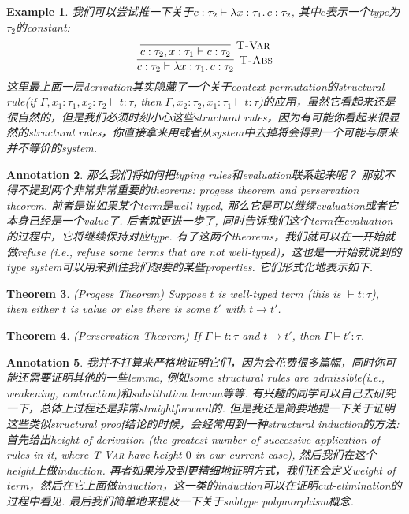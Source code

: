 \documentclass{article}
\newtheorem{theorem}{Theorem}[section]
\newtheorem{example}[theorem]{Example}
\newtheorem{annotation}[theorem]{Annotation}
\newcommand{\lam}[2]{\ensuremath{\lambda #1\ldotp #2}} %
\newcommand{\termtype}[2]{\ensuremath{#1:#2}}
\begin{document}
\begin{example}
\rm 我们可以尝试推一下关于$\termtype{c}{\tau_2}\vdash \termtype{\lam{\termtype{x}{\tau_1}}{c}}{\tau_2}$, 其中$c$表示一个type为$\tau_2$的constant:
\[
	\infer[\textsc{T-Abs}]{\termtype{c}{\tau_2}\vdash \termtype{\lam{\termtype{x}{\tau_1}}{c}}{\tau_2}}{\infer[\textsc{T-Var}]{\termtype{c}{\tau_2},\termtype{x}{\tau_1} \vdash \termtype{c}{\tau_2}}{}}
\]
这里最上面一层derivation其实隐藏了一个关于context permutation的structural rule(if $\Gamma,\termtype{x_1}{\tau_1},\termtype{x_2}{\tau_2} \vdash \termtype{t}{\tau}$, then $\Gamma,\termtype{x_2}{\tau_2},\termtype{x_1}{\tau_1} \vdash  \termtype{t}{\tau}$)的应用，虽然它看起来还是很自然的，但是我们必须时刻小心这些structural rules，因为有可能你看起来很显然的structural rules，你直接拿来用或者从system中去掉将会得到一个可能与原来并不等价的system.  
\end{example}

\begin{annotation}
\rm 那么我们将如何把typing rules和evaluation联系起来呢？ 那就不得不提到两个非常非常重要的theorems: \emph{progess theorem} and \emph{perservation theorem}. 前者是说如果某个term是well-typed, 那么它是可以继续evaluation或者它本身已经是一个value了. 后者就更进一步了, 同时告诉我们这个term在evaluation的过程中，它将继续保持对应type. 有了这两个theorems，我们就可以在一开始就做refuse (i.e., refuse some terms that are not well-typed)，这也是一开始就说到的type system可以用来抓住我们想要的某些properties. 它们形式化地表示如下.
\end{annotation}

\begin{theorem}
\rm (Progess Theorem) Suppose $t$ is well-typed term (this is $\vdash \termtype{t}{\tau}$), then either $t$ is value or else there is some $t'$ with $t \to t'$. 
\end{theorem}

\begin{theorem}
\rm (Perservation Theorem) If $\Gamma \vdash \termtype{t}{\tau}$ and $t \to t'$, then $\Gamma \vdash \termtype{t'}{\tau}$. 
\end{theorem}

\begin{annotation}
\rm 我并不打算来严格地证明它们，因为会花费很多篇幅，同时你可能还需要证明其他的一些lemma, 例如some structural rules are admissible(i.e., weakening, contraction)和substitution lemma等等. 有兴趣的同学可以自己去研究一下，总体上过程还是非常straightforward的. 但是我还是简要地提一下关于证明这些类似structural proof结论的时候，会经常用到一种structural induction的方法: 首先给出height of derivation (the greatest number of successive application of rules in it, where \textsc{T-Var} have height $0$ in our current case), 然后我们在这个height上做induction. 再者如果涉及到更精细地证明方式，我们还会定义weight of term，然后在它上面做induction，这一类的induction可以在证明cut-elimination的过程中看见. 最后我们简单地来提及一下关于\emph{subtype polymorphism}概念. 
\end{annotation}
\end{document}
